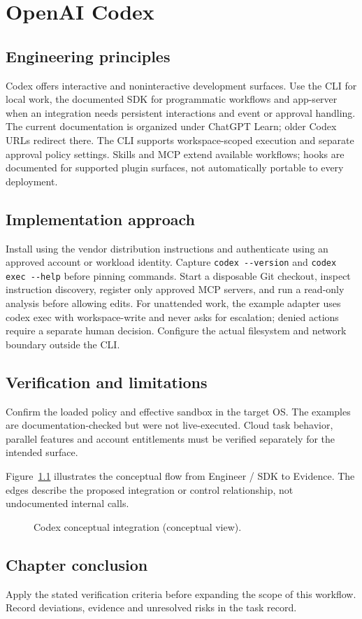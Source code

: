 \chapter{OpenAI Codex}

\section{Engineering principles}

Codex offers interactive and noninteractive development surfaces. Use the CLI for local work, the documented SDK for programmatic workflows and app-server when an integration needs persistent interactions and event or approval handling. The current documentation is organized under ChatGPT Learn; older Codex URLs redirect there. The CLI supports workspace-scoped execution and separate approval policy settings. Skills and MCP extend available workflows; hooks are documented for supported plugin surfaces, not automatically portable to every deployment.

\section{Implementation approach}

Install using the vendor distribution instructions and authenticate using an approved account or workload identity. Capture \texttt{codex -{}-version} and \texttt{codex exec -{}-help} before pinning commands. Start a disposable Git checkout, inspect instruction discovery, register only approved MCP servers, and run a read-only analysis before allowing edits. For unattended work, the example adapter uses codex exec with workspace-write and never asks for escalation; denied actions require a separate human decision. Configure the actual filesystem and network boundary outside the CLI.

\section{Verification and limitations}

Confirm the loaded policy and effective sandbox in the target OS. The examples are documentation-checked but were not live-executed. Cloud task behavior, parallel features and account entitlements must be verified separately for the intended surface.

Figure~\ref{fig:d3} illustrates the conceptual flow from Engineer / SDK to Evidence. The edges describe the proposed integration or control relationship, not undocumented internal calls.

\begin{figure}[htbp]\centering\caption{Codex conceptual integration (conceptual view).}\label{fig:d3}\end{figure}

\section{Chapter conclusion}

Apply the stated verification criteria before expanding the scope of this workflow. Record deviations, evidence and unresolved risks in the task record.
